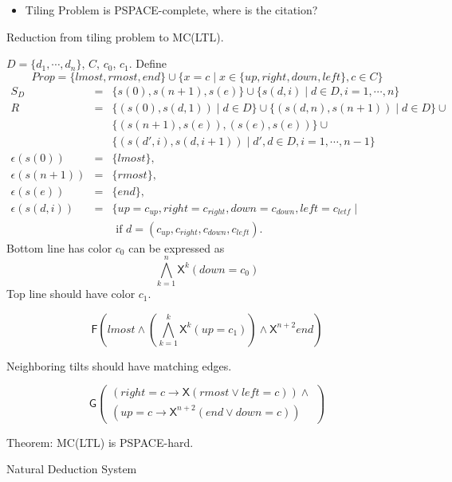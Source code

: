 \documentclass[12pt]{article}
\begin{document}
\begin{CJK*}{GBK}{song}
\begin{itemize}
\item Tiling Problem is PSPACE-complete, where is the citation?
\end{itemize}

Reduction from tiling problem to MC(LTL).

$D=\{d_1,\cdots, d_n\}$, $C$, $c_0$, $c_1$. Define
$$Prop=\{lmost, rmost, end\}\cup\{x=c\mid x\in\{up, right, down, left\}, c\in C\}$$
%
%
$$\begin{array}{lll}S_D&=&\{s(0), s(n+1), s(e)\}\cup\{s{(d,i)}\mid d\in D, i=1,\cdots,n\}\\

R&=&\{(s(0),s(d,1))\mid d\in D\}\cup\{(s(d,n), s(n+1))\mid d\in D\}\cup\\ &&\{(s(n+1),s(e)), (s(e),s(e))\}\cup\\ && \{(s(d',i),s(d,i+1))\mid d',d\in D, i=1,\cdots,n-1\}\\
\epsilon(s(0))&=&\{lmost\},\\ \epsilon(s(n+1))&=&\{rmost\},\\ \epsilon(s(e))&=&\{end\},\\
\epsilon(s(d,i))&=&\{up=c_{up}, right=c_{right}, down=c_{down}, left=c_{letf}\mid \\ &&\mbox{ if }d=(c_{up}, c_{right}, c_{down}, c_{left}).
\end{array}$$
%
Bottom line has color $c_0$ can be expressed as
$$ \bigwedge_{k=1}^n \textsf{X}^k(down=c_0)$$
Top line should have color $c_1$. %

$$\textsf{F}\left(lmost\wedge \left(\bigwedge_{k=1}^k \textsf{X}^k(up=c_1)\right)\wedge \textsf{X}^{n+2}end
\right)$$

Neighboring tilts should have matching edges. %

$$\textsf{G}\left(\begin{array}{l}
(right=c\rightarrow \textsf{X}(rmost\vee left=c))\wedge\\
(up=c\rightarrow \textsf{X}^{n+2}(end\vee down=c))\end{array}
\right)$$


Theorem: MC(LTL) is PSPACE-hard.





Natural Deduction System


\end{CJK*}
\end{document}
